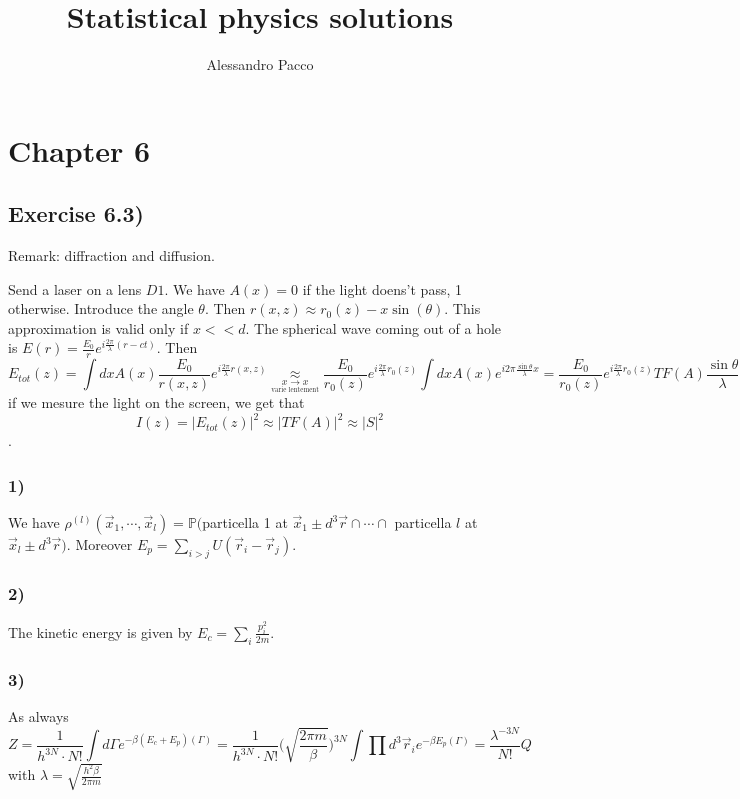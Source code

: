 \documentclass[10pt,a4paper]{book}
\author{Alessandro Pacco}
\title{Statistical physics solutions}
\begin{document}
 
\maketitle


\chapter*{Chapter 6}
\section*{Exercise 6.3)}




Remark: diffraction and diffusion.

Send a laser on a lens $D1$. We have $A(x)=0$ if the light doens't pass, 1 otherwise. Introduce the angle $\theta$. Then $r(x,z)\approx r_0(z)-x\sin(\theta)$. This approximation is valid only if $x<<d$. The spherical wave coming out of a hole is $E(r)=\frac{E_0}{r}e^{i\frac{2\pi}{\lambda}(r-ct)}$. Then $$E_{tot}(z)=\int dxA(x)\frac{E_0}{r(x,z)}e^{i\frac{2\pi}{\lambda}r(x,z)}\underset{\underset{\text{varie lentement}}{x\to x}}{\approx} \frac{E_0}{r_0(z)}e^{i\frac{2\pi}{\lambda}r_0(z)}\int dxA(x)e^{i2\pi\frac{\sin\theta}{\lambda}x}=\frac{E_0}{r_0(z)}e^{i\frac{2\pi}{\lambda}r_0(z)}TF(A)\frac{\sin\theta}{\lambda}$$
if we mesure the light on the screen, we get that
$$I(z)=|E_{tot}(z)|^2\approx |TF(A)|^2\approx |S|^2$$.


\subsection*{1)}
We have $\rho^{(l)}(\vec{x}_1,\cdots,\vec{x}_l)=\mathbb{P}($particella 1 at $\vec{x}_1\pm d^3\vec{r}\cap\cdots\cap$ particella $l$ at $\vec{x}_l\pm d^3\vec{r}).$
Moreover $E_p=\sum_{i>j} U(\vec{r}_i-\vec{r}_j)$.

\subsection*{2)}
The kinetic energy is given by $E_c=\sum_{i}\frac{p_i^2}{2m}$.

\subsection*{3)}
As always
$$Z=\frac{1}{h^{3N}\cdot N!}\int d\Gamma e^{-\beta (E_c+E_p)(\Gamma)}=\frac{1}{h^{3N}\cdot N!}\bigg(\sqrt{\frac{2\pi m}{\beta}}\bigg)^{3N}\int \prod d^{3}\vec{r}_i e^{-\beta E_p(\Gamma)}=\frac{\lambda^{-3N}}{N!}Q$$
with $\lambda=\sqrt{\frac{h^{2}\beta}{2\pi m}}$
\end{document}
